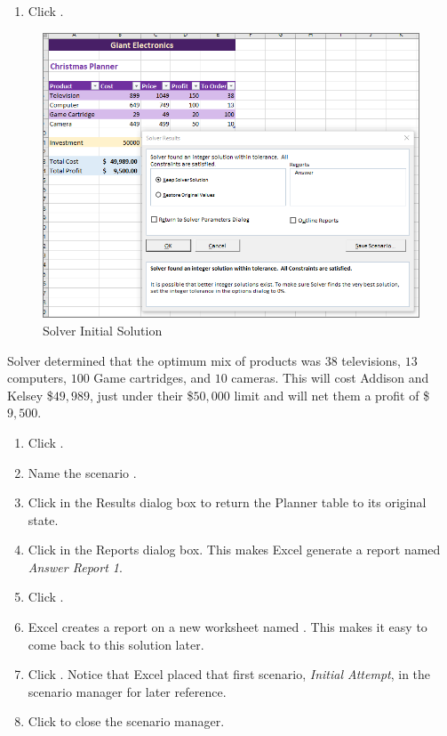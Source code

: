 \begin{enumerate}[resume]
	\item Click .
\end{enumerate}

\begin{figure}[H]
	\centering
	\includegraphics[width=\maxwidth{.95\linewidth}]{gfx/ch08_fig45}
	\caption{Solver Initial Solution}
	\label{08:fig45}
\end{figure}

Solver determined that the optimum mix of products was $ 38 $ televisions, $ 13 $ computers, $ 100 $ Game cartridges, and $ 10 $ cameras. This will cost Addison and Kelsey \$$ 49,989 $, just under their \$$ 50,000 $ limit and will net them a profit of \$$ 9,500 $. 

\begin{enumerate}[resume]
	\item Click .
	\item Name the scenario .
	\item Click  in the Results dialog box to return the Planner table to its original state.
	\item Click  in the Reports dialog box. This makes Excel generate a report named \textit{Answer Report 1}.
	\item Click .
	\item Excel creates a report on a new worksheet named . This makes it easy to come back to this solution later.
	\item Click .	Notice that Excel placed that first scenario, \textit{Initial Attempt}, in the scenario manager for later reference.
	\item Click  to close the scenario manager.
\end{enumerate}


